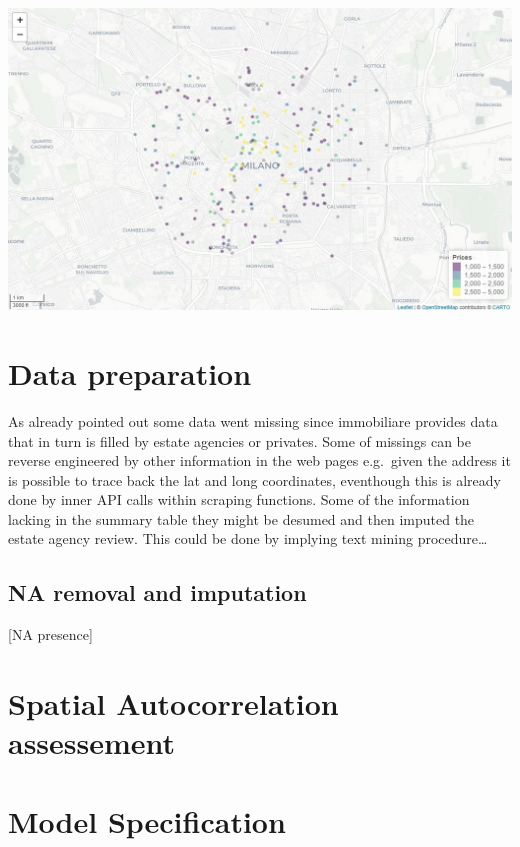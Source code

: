 \documentclass[
  12pt,
  a4paper,
  oneside]{book}
\begin{document}
\includegraphics[width=1\linewidth]{images/leaflet_prezzi}

\hypertarget{data-preparation}{%
\section{Data preparation}\label{data-preparation}}

As already pointed out some data went missing since immobiliare provides data that in turn is filled by estate agencies or privates. Some of missings can be reverse engineered by other information in the web pages e.g.~given the address it is possible to trace back the lat and long coordinates, eventhough this is already done by inner API calls within scraping functions. Some of the information lacking in the summary table they might be desumed and then imputed the estate agency review. This could be done by implying text mining procedure\ldots{}

\hypertarget{na-removal-and-imputation}{%
\subsection{NA removal and imputation}\label{na-removal-and-imputation}}

{[}NA presence{]}

\hypertarget{spatial-autocorrelation-assessement}{%
\section{Spatial Autocorrelation assessement}\label{spatial-autocorrelation-assessement}}

\hypertarget{model-specification}{%
\section{Model Specification}\label{model-specification}}
\end{document}
